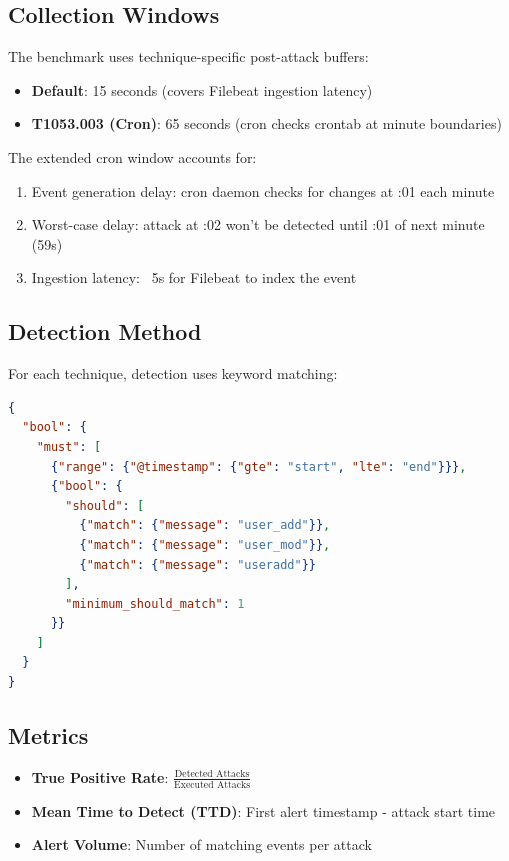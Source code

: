 \documentclass[11pt,a4paper]{article}
\begin{document}
\subsection{Collection Windows}

The benchmark uses technique-specific post-attack buffers:

\begin{itemize}
    \item \textbf{Default}: 15 seconds (covers Filebeat ingestion latency)
    \item \textbf{T1053.003 (Cron)}: 65 seconds (cron checks crontab at minute boundaries)
\end{itemize}

The extended cron window accounts for:
\begin{enumerate}
    \item Event generation delay: cron daemon checks for changes at :01 each minute
    \item Worst-case delay: attack at :02 won't be detected until :01 of next minute (59s)
    \item Ingestion latency: ~5s for Filebeat to index the event
\end{enumerate}

\subsection{Detection Method}

For each technique, detection uses keyword matching:

\begin{lstlisting}[language=json,caption={Example: T1136.001 Detection Query}]
{
  "bool": {
    "must": [
      {"range": {"@timestamp": {"gte": "start", "lte": "end"}}},
      {"bool": {
        "should": [
          {"match": {"message": "user_add"}},
          {"match": {"message": "user_mod"}},
          {"match": {"message": "useradd"}}
        ],
        "minimum_should_match": 1
      }}
    ]
  }
}
\end{lstlisting}

\subsection{Metrics}

\begin{itemize}
    \item \textbf{True Positive Rate}: $\frac{\text{Detected Attacks}}{\text{Executed Attacks}}$
    \item \textbf{Mean Time to Detect (TTD)}: First alert timestamp - attack start time
    \item \textbf{Alert Volume}: Number of matching events per attack
\end{itemize}
\end{document}
